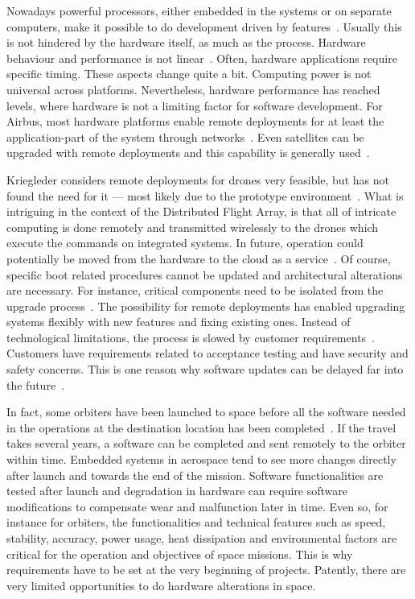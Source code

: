 \documentclass[english]{tktltiki2}
\begin{document}
Nowadays powerful processors, either embedded in the systems or on separate computers, make it possible to do development driven by features~\cite{BT15, Koi15}. Usually this is not hindered by the hardware itself, as much as the process. Hardware behaviour and performance is not linear~\cite{Hol15a}. Often, hardware applications require specific timing. These aspects change quite a bit. Computing power is not universal across platforms. Nevertheless, hardware performance has reached levels, where hardware is not a limiting factor for software development. For Airbus, most hardware platforms enable remote deployments for at least the application-part of the system through networks~\cite{Koi15}. Even satellites can be upgraded with remote deployments and this capability is generally used~\cite{Hol15b}.

Kriegleder considers remote deployments for drones very feasible, but has not found the need for it — most likely due to the prototype environment~\cite{Kri15}. What is intriguing in the context of the Distributed Flight Array, is that all of intricate computing is done remotely and transmitted wirelessly to the drones which execute the commands on integrated systems. In future, operation could potentially be moved from the hardware to the cloud as a service~\cite{Kri15}. Of course, specific boot related procedures cannot be updated and architectural alterations are necessary. For instance, critical components need to be isolated from the upgrade process~\cite{Kri15}. The possibility for remote deployments has enabled upgrading systems flexibly with new features and fixing existing ones. Instead of technological limitations, the process is slowed by customer requirements~\cite{BT15, Hol15b, Koi15}. Customers have requirements related to acceptance testing and have security and safety concerns. This is one reason why software updates can be delayed far into the future~\cite{BT15, Hol15b, Koi15}.

In fact, some orbiters have been launched to space before all the software needed in the operations at the destination location has been completed~\cite{Hol15b}. If the travel takes several years, a software can be completed and sent remotely to the orbiter within time. Embedded systems in aerospace tend to see more changes directly after launch and towards the end of the mission. Software functionalities are tested after launch and degradation in hardware can require software modifications to compensate wear and malfunction later in time. Even so, for instance for orbiters, the functionalities and technical features such as speed, stability, accuracy, power usage, heat dissipation and environmental factors are critical for the operation and objectives of space missions. This is why requirements have to be set at the very beginning of projects. Patently, there are very limited opportunities to do hardware alterations in space.
\end{document}
